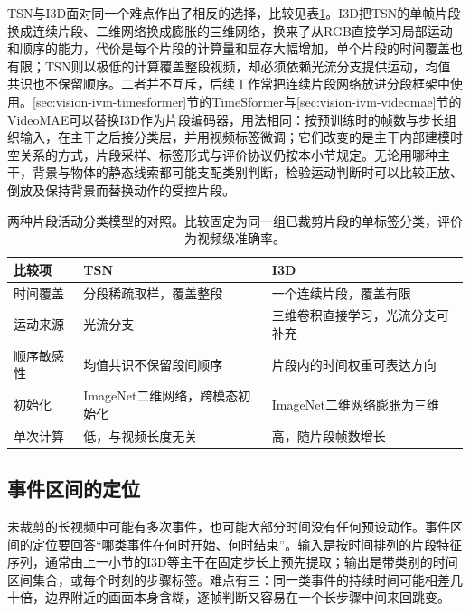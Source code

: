 TSN与I3D面对同一个难点作出了相反的选择，比较见表\ref{tab:vision-video-activity-compare}。I3D把TSN的单帧片段换成连续片段、二维网络换成膨胀的三维网络，换来了从RGB直接学习局部运动和顺序的能力，代价是每个片段的计算量和显存大幅增加，单个片段的时间覆盖也有限；TSN则以极低的计算覆盖整段视频，却必须依赖光流分支提供运动，均值共识也不保留顺序。二者并不互斥，后续工作常把连续片段网络放进分段框架中使用。\ref{sec:vision-ivm-timesformer}节的TimeSformer与\ref{sec:vision-ivm-videomae}节的VideoMAE可以替换I3D作为片段编码器，用法相同：按预训练时的帧数与步长组织输入，在主干之后接分类层，并用视频标签微调；它们改变的是主干内部建模时空关系的方式，片段采样、标签形式与评价协议仍按本小节规定。无论用哪种主干，背景与物体的静态线索都可能支配类别判断，检验运动判断时可以比较正放、倒放及保持背景而替换动作的受控片段。

\begin{table}[htbp]
  \centering
  \small
  \begin{tabularx}{\linewidth}{@{}lXX@{}}
    \toprule
    比较项 & TSN & I3D\\
    \midrule
    时间覆盖 & 分段稀疏取样，覆盖整段 & 一个连续片段，覆盖有限\\
    运动来源 & 光流分支 & 三维卷积直接学习，光流分支可补充\\
    顺序敏感性 & 均值共识不保留段间顺序 & 片段内的时间权重可表达方向\\
    初始化 & ImageNet二维网络，跨模态初始化 & ImageNet二维网络膨胀为三维\\
    单次计算 & 低，与视频长度无关 & 高，随片段帧数增长\\
    \bottomrule
  \end{tabularx}
  \caption{两种片段活动分类模型的对照。比较固定为同一组已裁剪片段的单标签分类，评价为视频级准确率。}
  \label{tab:vision-video-activity-compare}
\end{table}

\subsection{事件区间的定位}
\label{sec:vision-video-temporal-boundaries}

未裁剪的长视频中可能有多次事件，也可能大部分时间没有任何预设动作。事件区间的定位要回答“哪类事件在何时开始、何时结束”。输入是按时间排列的片段特征序列，通常由上一小节的I3D等主干在固定步长上预先提取；输出是带类别的时间区间集合，或每个时刻的步骤标签。难点有三：同一类事件的持续时间可能相差几十倍，边界附近的画面本身含糊，逐帧判断又容易在一个长步骤中间来回跳变。

